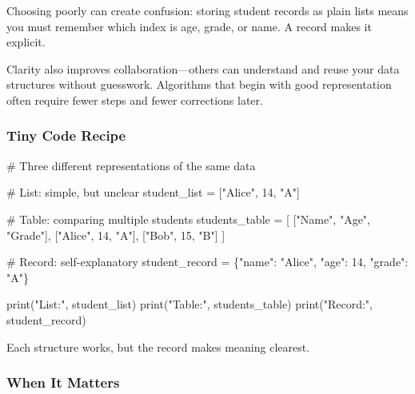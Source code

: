 \documentclass[
  letterpaper,
  DIV=11,
  numbers=noendperiod]{scrreprt}
\newenvironment{Shaded}{\begin{snugshade}}{\end{snugshade}}
\newcommand{\BuiltInTok}[1]{\textcolor[rgb]{0.00,0.23,0.31}{#1}}
\newcommand{\CommentTok}[1]{\textcolor[rgb]{0.37,0.37,0.37}{#1}}
\newcommand{\DecValTok}[1]{\textcolor[rgb]{0.68,0.00,0.00}{#1}}
\newcommand{\NormalTok}[1]{\textcolor[rgb]{0.00,0.23,0.31}{#1}}
\newcommand{\OperatorTok}[1]{\textcolor[rgb]{0.37,0.37,0.37}{#1}}
\newcommand{\StringTok}[1]{\textcolor[rgb]{0.13,0.47,0.30}{#1}}
\begin{document}
Choosing poorly can create confusion: storing student records as plain
lists means you must remember which index is age, grade, or name. A
record makes it explicit.

Clarity also improves collaboration---others can understand and reuse
your data structures without guesswork. Algorithms that begin with good
representation often require fewer steps and fewer corrections later.

\subsubsection{Tiny Code Recipe}\label{tiny-code-recipe-53}

\begin{Shaded}
\begin{Highlighting}[]
\CommentTok{\# Three different representations of the same data}

\CommentTok{\# List: simple, but unclear}
\NormalTok{student\_list }\OperatorTok{=}\NormalTok{ [}\StringTok{"Alice"}\NormalTok{, }\DecValTok{14}\NormalTok{, }\StringTok{"A"}\NormalTok{]}

\CommentTok{\# Table: comparing multiple students}
\NormalTok{students\_table }\OperatorTok{=}\NormalTok{ [}
\NormalTok{    [}\StringTok{"Name"}\NormalTok{, }\StringTok{"Age"}\NormalTok{, }\StringTok{"Grade"}\NormalTok{],}
\NormalTok{    [}\StringTok{"Alice"}\NormalTok{, }\DecValTok{14}\NormalTok{, }\StringTok{"A"}\NormalTok{],}
\NormalTok{    [}\StringTok{"Bob"}\NormalTok{, }\DecValTok{15}\NormalTok{, }\StringTok{"B"}\NormalTok{]}
\NormalTok{]}

\CommentTok{\# Record: self{-}explanatory}
\NormalTok{student\_record }\OperatorTok{=}\NormalTok{ \{}\StringTok{"name"}\NormalTok{: }\StringTok{"Alice"}\NormalTok{, }\StringTok{"age"}\NormalTok{: }\DecValTok{14}\NormalTok{, }\StringTok{"grade"}\NormalTok{: }\StringTok{"A"}\NormalTok{\}}

\BuiltInTok{print}\NormalTok{(}\StringTok{"List:"}\NormalTok{, student\_list)}
\BuiltInTok{print}\NormalTok{(}\StringTok{"Table:"}\NormalTok{, students\_table)}
\BuiltInTok{print}\NormalTok{(}\StringTok{"Record:"}\NormalTok{, student\_record)}
\end{Highlighting}
\end{Shaded}

Each structure works, but the record makes meaning clearest.

\subsubsection{When It Matters}\label{when-it-matters-53}
\end{document}
